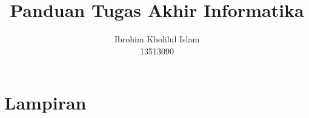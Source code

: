 \documentclass[12pt, a4paper, onecolumn, oneside, final]{report}
\begin{document}
\title{Panduan Tugas Akhir Informatika}
\date{}
\author{Ibrohim Kholilul Islam\\
13513090}

\setcounter{page}{0}



\pagestyle{plain}





\tableofcontents
\listoffigures
\listoftables

\setcounter{page}{0}











\printbibliography

\appendix
{}
\part*{Lampiran}



\end{document}
